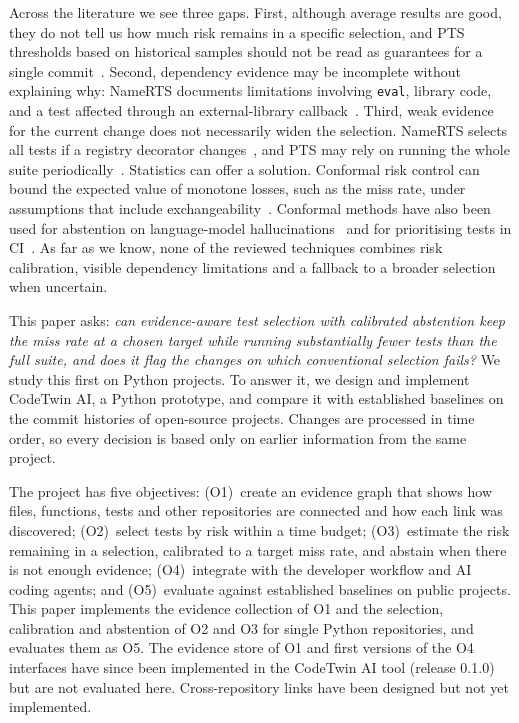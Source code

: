\documentclass[conference]{IEEEtran}
\begin{document}
Across the literature we see three gaps. First, although average results are good, they do not tell us how much risk remains in a specific selection, and PTS thresholds based on historical samples should not be read as guarantees for a single commit~\cite{machalica2019pts}. Second, dependency evidence may be incomplete without explaining why: NameRTS documents limitations involving \texttt{eval}, library code, and a test affected through an external-library callback~\cite{wang2026namerts}. Third, weak evidence for the current change does not necessarily widen the selection. NameRTS selects all tests if a registry decorator changes~\cite{wang2026namerts}, and PTS may rely on running the whole suite periodically~\cite{machalica2019pts}. Statistics can offer a solution. Conformal risk control can bound the expected value of monotone losses, such as the miss rate, under assumptions that include exchangeability~\cite{angelopoulos2024crc}. Conformal methods have also been used for abstention on language-model hallucinations~\cite{yadkori2024abstention} and for prioritising tests in CI~\cite{altinisik2026conformal}. As far as we know, none of the reviewed techniques combines risk calibration, visible dependency limitations and a fallback to a broader selection when uncertain.

This paper asks: \emph{can evidence-aware test selection with calibrated abstention keep the miss rate at a chosen target while running substantially fewer tests than the full suite, and does it flag the changes on which conventional selection fails?} We study this first on Python projects. To answer it, we design and implement CodeTwin AI, a Python prototype, and compare it with established baselines on the commit histories of open-source projects. Changes are processed in time order, so every decision is based only on earlier information from the same project.

The project has five objectives: (O1)~create an evidence graph that shows how files, functions, tests and other repositories are connected and how each link was discovered; (O2)~select tests by risk within a time budget; (O3)~estimate the risk remaining in a selection, calibrated to a target miss rate, and abstain when there is not enough evidence; (O4)~integrate with the developer workflow and AI coding agents; and (O5)~evaluate against established baselines on public projects. This paper implements the evidence collection of O1 and the selection, calibration and abstention of O2 and O3 for single Python repositories, and evaluates them as O5. The evidence store of O1 and first versions of the O4 interfaces have since been implemented in the CodeTwin AI tool (release 0.1.0) but are not evaluated here. Cross-repository links have been designed but not yet implemented.
\end{document}

